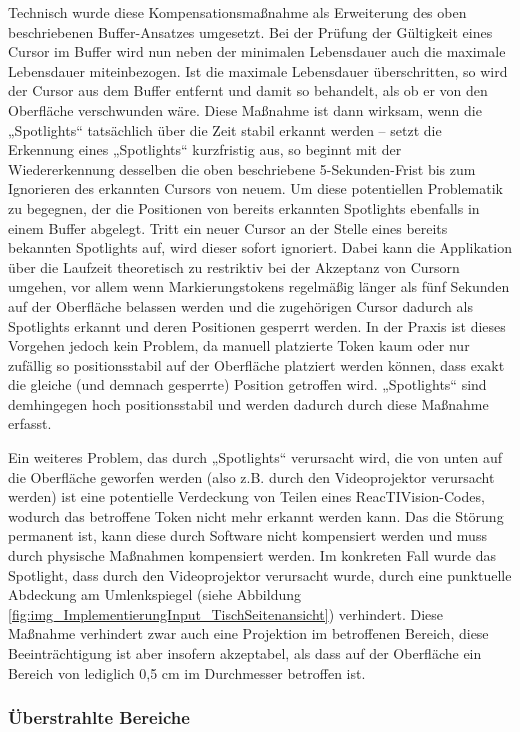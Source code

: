 Technisch wurde diese Kompensationsmaßnahme als Erweiterung des oben beschriebenen Buffer-Ansatzes umgesetzt. Bei der Prüfung der Gültigkeit eines Cursor im Buffer wird nun neben der minimalen Lebensdauer auch die maximale Lebensdauer miteinbezogen. Ist die maximale Lebensdauer überschritten, so wird der Cursor aus dem Buffer entfernt und damit so behandelt, als ob er von den Oberfläche verschwunden wäre. Diese Maßnahme ist dann wirksam, wenn die „Spotlights“ tatsächlich über die Zeit stabil erkannt werden -- setzt die Erkennung eines „Spotlights“ kurzfristig aus, so beginnt mit der Wiedererkennung desselben die oben beschriebene 5-Sekunden-Frist bis zum Ignorieren des erkannten Cursors von neuem. Um diese potentiellen Problematik zu begegnen, der die Positionen von bereits erkannten Spotlights ebenfalls in einem Buffer abgelegt. Tritt ein neuer Cursor an der Stelle eines bereits bekannten Spotlights auf, wird dieser sofort ignoriert. Dabei kann die Applikation über die Laufzeit theoretisch zu restriktiv bei der Akzeptanz von Cursorn umgehen, vor allem wenn Markierungstokens regelmäßig länger als fünf Sekunden auf der Oberfläche belassen werden und die zugehörigen Cursor dadurch als Spotlights erkannt und deren Positionen gesperrt werden. In der Praxis ist dieses Vorgehen jedoch kein Problem, da manuell platzierte Token kaum oder nur zufällig so positionsstabil auf der Oberfläche platziert werden können, dass exakt die gleiche (und demnach gesperrte) Position getroffen wird. „Spotlights“ sind demhingegen hoch positionsstabil und werden dadurch durch diese Maßnahme erfasst.

Ein weiteres Problem, das durch „Spotlights“ verursacht wird, die von unten auf die Oberfläche geworfen werden (also z.B. durch den Videoprojektor verursacht werden) ist eine potentielle Verdeckung von Teilen eines ReacTIVision-Codes, wodurch das betroffene Token nicht mehr erkannt werden kann. Das die Störung permanent ist, kann diese durch Software nicht kompensiert werden und muss durch physische Maßnahmen kompensiert werden. Im konkreten Fall wurde das Spotlight, dass durch den Videoprojektor verursacht wurde, durch eine punktuelle Abdeckung am Umlenkspiegel (siehe Abbildung \ref{fig:img_ImplementierungInput_TischSeitenansicht}) verhindert. Diese Maßnahme verhindert zwar auch eine Projektion im betroffenen Bereich, diese Beeinträchtigung ist aber insofern akzeptabel, als dass auf der Oberfläche ein Bereich von lediglich 0,5 cm im Durchmesser betroffen ist.

\subsubsection{Überstrahlte Bereiche} %
\label{ssub:überstrahlung}


